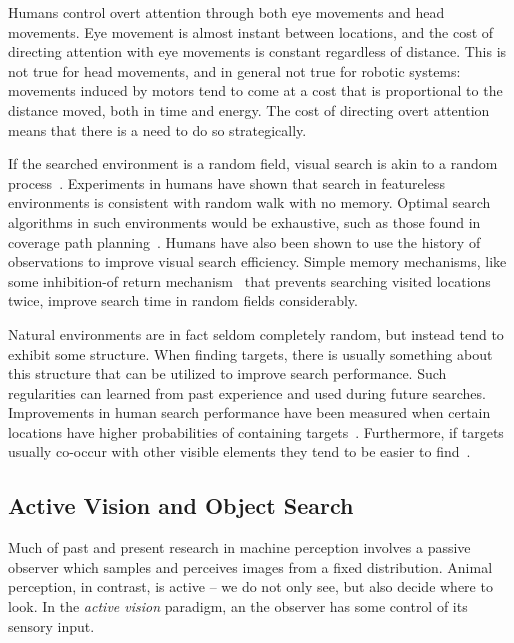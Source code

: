 Humans control overt attention through both eye movements and head movements.
Eye movement is almost instant between locations, and the cost of directing attention with eye movements is constant regardless of distance.
This is not true for head movements, and in general not true for robotic systems:
movements induced by motors tend to come at a cost that is proportional to the distance moved, both in time and energy.
The cost of directing overt attention means that there is a need to do so strategically.

If the searched environment is a random field, visual search is akin to a random process~\cite{nakayama_situating_2011}.
Experiments in humans have shown that search in featureless environments is consistent with random walk with no memory.
Optimal search algorithms in such environments would be exhaustive, such as those found in coverage path planning~\cite{galceran_survey_2013}.
Humans have also been shown to use the history of observations to improve visual search efficiency. 
Simple memory mechanisms, like some inhibition-of return mechanism~\cite{itti_computational_2001} that prevents searching visited locations twice, improve search time in random fields considerably.

Natural environments are in fact seldom completely random, but instead tend to exhibit some structure.
When finding targets, there is usually something about this structure that can be utilized to improve search performance.
Such regularities can learned from past experience and used during future searches.
Improvements in human search performance have been measured when certain locations have higher probabilities of containing targets~\cite{eckstein_visual_2011,wolfe_five_2017}.
Furthermore, if targets usually co-occur with other visible elements they tend to be easier to find~\cite{eckstein_visual_2011,wolfe_five_2017}.

\subsection{Active Vision and Object Search} 
\label{sec:activevision}

Much of past and present research in machine perception involves a passive observer which samples and perceives images from a fixed distribution.
Animal perception, in contrast, is active -- we do not only see, but also decide where to look.
In the \textit{active vision} paradigm, an the observer has some control of its sensory input.~\cite{aloimonos_active_1988}

